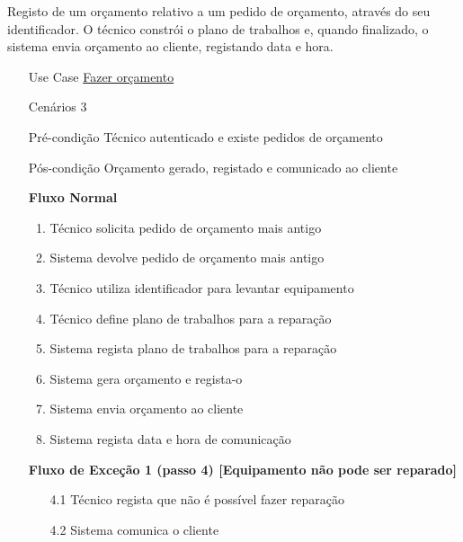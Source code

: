 \documentclass[../relatorio.tex]{subfiles}
\begin{document}
Registo de um orçamento relativo a um pedido de orçamento, através do seu identificador.
O técnico constrói o plano de trabalhos e, quando finalizado, o sistema envia orçamento ao cliente,
registando data e hora.
\begin{itemize}
    \item[Use Case] {\underline{Fazer orçamento}}
    \item[Cenários] {3}
    \item[Pré-condição] {Técnico autenticado e existe pedidos de orçamento}
    \item[Pós-condição] {Orçamento gerado, registado e comunicado ao cliente}
          \begin{flushleft}
              \textbf{Fluxo Normal}
          \end{flushleft}
          \begin{enumerate}
              \item Técnico solicita pedido de orçamento mais antigo
              \item Sistema devolve pedido de orçamento mais antigo
              \item Técnico utiliza identificador para levantar equipamento
              \item Técnico define plano de trabalhos para a reparação
              \item Sistema regista plano de trabalhos para a reparação
              \item Sistema gera orçamento e regista-o
              \item Sistema envia orçamento ao cliente
              \item Sistema regista data e hora de comunicação
          \end{enumerate}
          \begin{flushleft}
              \textbf{Fluxo de Exceção 1 (passo 4) [Equipamento não pode ser reparado]}
          \end{flushleft}
          \begin{itemize}
              \item[4.1] {Técnico regista que não é possível fazer reparação}
              \item[4.2] {Sistema comunica o cliente}
          \end{itemize}
\end{itemize}
\end{document}
